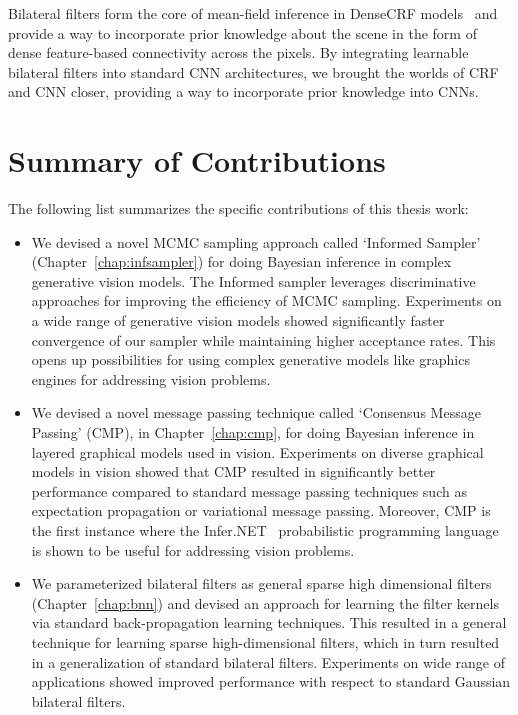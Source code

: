 Bilateral filters form the core of mean-field
inference in DenseCRF models~\cite{krahenbuhl2012efficient} and provide a way to incorporate
prior knowledge about the scene in the form of dense feature-based connectivity
across the pixels. By integrating learnable bilateral filters into standard CNN architectures,
we brought the worlds of CRF and CNN closer, providing a way to incorporate prior
knowledge into CNNs.

\section{Summary of Contributions}

The following list summarizes the specific contributions of this thesis work:

\begin{itemize}
\item We devised a novel MCMC sampling approach called `Informed Sampler' (Chapter~\ref{chap:infsampler})
for doing Bayesian inference in complex generative vision models.
The Informed sampler leverages discriminative approaches
for improving the efficiency of MCMC sampling. Experiments on a wide range of generative vision
models showed significantly faster convergence of our sampler while maintaining higher acceptance rates.
This opens up possibilities for using complex generative models like graphics engines for addressing vision problems.

\item We devised a novel message passing technique called `Consensus Message Passing’ (CMP),
in Chapter~\ref{chap:cmp}, for doing Bayesian inference in layered graphical models used in vision.
Experiments on diverse
graphical models in vision showed that CMP resulted in significantly better performance compared
to standard message passing techniques such as expectation propagation or variational message passing.
Moreover, CMP is the first instance where the Infer.NET~\cite{InferNET2012} probabilistic programming language is shown to
be useful for addressing vision problems.

\item We parameterized bilateral filters as general sparse high dimensional filters (Chapter~\ref{chap:bnn}) and
devised an approach for learning the filter kernels via standard back-propagation learning
techniques. This resulted in a general technique for learning sparse high-dimensional filters,
which in turn resulted in a generalization of standard bilateral filters. Experiments on wide
range of applications showed improved performance with respect to standard Gaussian bilateral filters.


\end{itemize}
